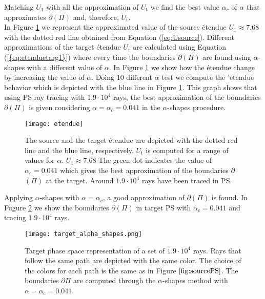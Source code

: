 Matching $U_1$ with all the approximation of $U_{\textrm{t}}$ we find the best value $\alpha_c$ of $\alpha$ that approximates $\partial$$(\Pi)$ and, therefore, $U_{\textrm{t}}$. \\ \indent In Figure \ref{fig:etendueTS} we represent the approximated value of the source \'{e}tendue $U_1\approx 7.68$ with the dotted red line obtained from Equation (\ref{eq:Usource}). Different approximations of the target \'{e}tendue $U_{\textrm{t}}$ are calculated using Equation (\ref{{eq:etenduetarg1}}) where every time the boundaries $\partial$$(\Pi)$ are found using $\alpha$-shapes with a different value of $\alpha$. In Figure \ref{fig:etendueTS} we show how the \'{e}tendue change by increasing the value of $\alpha$. Doing $10$ different $\alpha$ test we compute the '{e}tendue behavior which is depicted with the blue line in Figure \ref{fig:etendueTS}. This graph    
shows that using PS ray tracing with $1.9\cdot 10^4$ rays, the best approximation of the boundaries $\partial$$(\Pi)$ is given considering $\alpha = \alpha_c = 0.041$ in the $\alpha$-shapes procedure.
 \begin{figure}[h]
  \begin{center}
  \texttt{[image: etendue]}
  \end{center}
  \caption{\footnotesize{The source and the target \'{e}tendue are depicted with the dotted red line and the blue line, respectively.
  $U_\textrm{t}$ is computed for a range of values for $\alpha$. $U_1 \approx 7.68$
   The green dot indicates the value of $\alpha_c = 0.041$ which gives the best approximation of the boundaries $\partial$$(\Pi)$ at the target.
   Around $1.9 \cdot 10^4$ rays have been traced in PS.
  }}
  \label{fig:etendueTS}
\end{figure}
Applying $\alpha$-shapes with $\alpha=\alpha_c$, a good approximation of $\partial$$(\Pi)$ is found. In Fugure \ref{fig:targetPS} we show the boundaries 
$\partial$$(\Pi)$ in target PS  with $\alpha_c=0.041$ and tracing $1.9\cdot10^4$ rays.
  \begin{figure}[h]
  \begin{center}
  \texttt{[image: target\_alpha\_shapes.png]}
  \end{center}
  \caption{\footnotesize{Target phase space representation of a set of $1.9 \cdot 10^4$ rays.
  Rays that follow the same path are depicted with the same color. The choice of the colors for each path is the same as in Figure $\ref{fig:sourcePS}$. The boundaries $\partial$$\Pi$ are computed through the $\alpha$-shapes method with $\alpha = \alpha_c = 0.041$.}}
  \label{fig:targetPS}
\end{figure}
